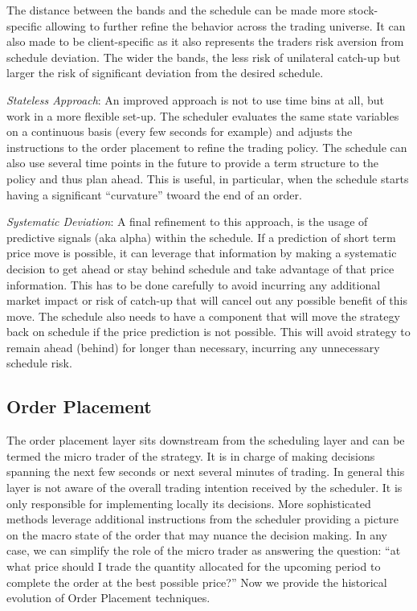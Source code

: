 The distance between the bands and the schedule can be made more stock-specific allowing to further refine the behavior across the trading universe. It can also made to be client-specific as it also represents the traders risk aversion from schedule deviation. The wider the bands, the less risk of unilateral catch-up but larger the risk of significant deviation from the desired schedule. \twomedskip


\noindent\emph{Stateless Approach}: An improved approach is not to use time bins at all, but work in a more flexible set-up. The scheduler evaluates the same state variables on a continuous basis (every few seconds for example) and adjusts the instructions to the order placement to refine the trading policy. The schedule can also use several time points in the future to provide a term structure to the policy and thus plan ahead. This is useful, in particular, when the schedule starts having a significant ``curvature'' twoard the end of an order. \twomedskip


\noindent\emph{Systematic Deviation}: A final refinement to this approach, is the usage of predictive signals (aka alpha) within the schedule. If a prediction of short term price move is possible, it can leverage that information by making a systematic decision to get ahead or stay behind schedule and take advantage of that price information. This has to be done carefully to avoid incurring any additional market impact or risk of catch-up that will cancel out any possible benefit of this move. The schedule also needs to have a component that will move the strategy back on schedule if the price prediction is not possible. This will avoid strategy to remain ahead (behind) for longer than necessary, incurring any unnecessary schedule risk.



\subsection{Order Placement}

The order placement layer sits downstream from the scheduling layer and can be termed the micro trader of the strategy. It is in charge of making decisions spanning the next few seconds or next several minutes of trading. In general this layer is not aware of the overall trading intention received by the scheduler. It is only responsible for implementing locally its decisions. More sophisticated methods leverage additional instructions from the scheduler providing a picture on the macro state of the order that may nuance the decision making. In any case, we can simplify the role of the micro trader as answering the question: ``at what price should I trade the quantity allocated for the upcoming period to complete the order at the best possible price?'' Now we provide the historical evolution of Order Placement techniques. \twomedskip


